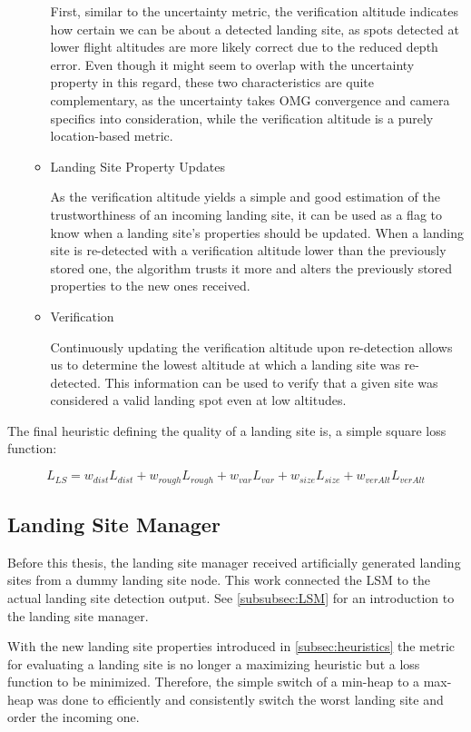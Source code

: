 \begin{itemize}
\begin{itemize}
        First, similar to the uncertainty metric, the verification altitude indicates how certain we can be about a detected landing site, as spots detected at lower flight altitudes are more likely correct due to the reduced depth error. Even though it might seem to overlap with the uncertainty property in this regard, these two characteristics are quite complementary, as the uncertainty takes OMG convergence and camera specifics into consideration, while the verification altitude is a purely location-based metric.
        \item Landing Site Property Updates

        As the verification altitude yields a simple and good estimation of the trustworthiness of an incoming landing site, it can be used as a flag to know when a landing site's properties should be updated. When a landing site is re-detected with a verification altitude lower than the previously stored one, the algorithm trusts it more and alters the previously stored properties to the new ones received.
        \item Verification

        Continuously updating the verification altitude upon re-detection allows us to determine the lowest altitude at which a landing site was re-detected. This information can be used to verify that a given site was considered a valid landing spot even at low altitudes. 
    \end{itemize}
\end{itemize}

The final heuristic defining the quality of a landing site is, a simple square loss function:

\begin{equation}
    L_{LS} = w_{dist}L_{dist} + w_{rough}L_{rough} + w_{var}L_{var} + w_{size}L_{size} + w_{verAlt}L_{verAlt}
    \label{eq:loss_fct}
\end{equation}


\subsection{Landing Site Manager}

Before this thesis, the landing site manager received artificially generated landing sites from a dummy landing site node. This work connected the LSM to the actual landing site detection output. See \cref{subsubsec:LSM} for an introduction to the landing site manager.

With the new landing site properties introduced in \cref{subsec:heuristics} the metric for evaluating a landing site is no longer a maximizing heuristic but a loss function to be minimized. Therefore, the simple switch of a min-heap to a max-heap was done to efficiently and consistently switch the worst landing site and order the incoming one.

